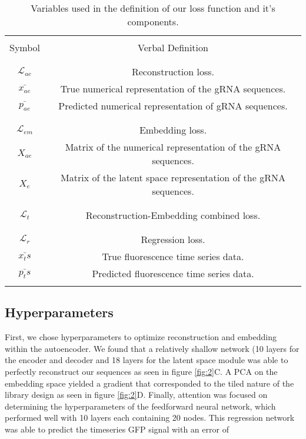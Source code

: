 \documentclass[times]{zHenriquesLab-StyleBioRxiv}
\begin{document}
\begin{table}
\centering
    \scriptsize
    \begin{tabular}{|c|c|}
        \hline
        & \\
        Symbol & Verbal Definition \\
        & \\
        \hline
        \hline
        & \\
        $\mathcal{L}_{ae}$ & Reconstruction loss. \\
        $\bar{x_{ae}}$ & True numerical representation of the gRNA sequences.\\
        $\bar{p_{ae}}$ & Predicted numerical representation of gRNA sequences.\\
        & \\
        \hline
        & \\
        $\mathcal{L}_{em}$ & Embedding loss. \\
        $X_{ae}$ & Matrix of the numerical representation of the gRNA sequences.\\
        $X_e$ & Matrix of the latent space representation of the gRNA sequences.\\
        & \\
        \hline
        & \\
        $\mathcal{L}_t$ & Reconstruction-Embedding combined loss.\\
        & \\
        \hline
        & \\
        $\mathcal{L}_r$ & Regression loss.\\
        $\bar{x_ts}$ & True fluorescence time series data.\\
        $\bar{p_ts}$ & Predicted fluorescence time series data.\\
        &\\
        \hline  
    \end{tabular}
    \caption{Variables used in the definition of our loss function and it's components.}
    \label{table:1}
\end{table}

\subsection{Hyperparameters}
First, we chose hyperparameters to optimize reconstruction and embedding within the autoencoder. We found that a relatively shallow network (10 layers for the encoder and decoder and 18 layers for the latent space module was able to perfectly reconstruct our sequences as seen in figure \ref{fig:2}C. A PCA on the embedding space yielded a gradient that corresponded to the tiled nature of the library design as seen in figure \ref{fig:2}D. Finally, attention was focused on determining the hyperparameters of the feedforward neural network, which performed well with 10 layers each containing 20 nodes. This regression network was able to predict the timeseries GFP signal with an error of 
\newline
\newline
\end{document}

